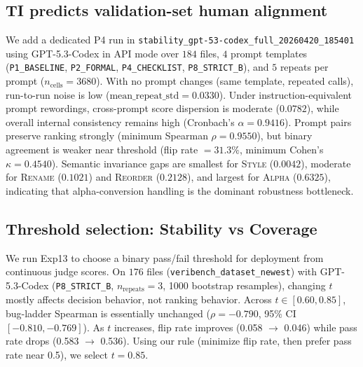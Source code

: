 \documentclass{article}
\begin{document}
\subsection{TI predicts validation-set human alignment}
We add a dedicated P4 run in \texttt{stability\_gpt-53-codex\_full\_20260420\_185401} using GPT-5.3-Codex in API mode over \(184\) files, \(4\) prompt templates (\texttt{P1\_BASELINE}, \texttt{P2\_FORMAL}, \texttt{P4\_CHECKLIST}, \texttt{P8\_STRICT\_B}), and \(5\) repeats per prompt (\(n_\text{cells}=3680\)).
With no prompt changes (same template, repeated calls), run-to-run noise is low (\(\text{mean\_repeat\_std}=0.0330\)).
Under instruction-equivalent prompt rewordings, cross-prompt score dispersion is moderate (\(0.0782\)), while overall internal consistency remains high (Cronbach's \(\alpha=0.9416\)).
Prompt pairs preserve ranking strongly (minimum Spearman \(\rho=0.9550\)), but binary agreement is weaker near threshold (flip rate \(=31.3\%\), minimum Cohen's \(\kappa=0.4540\)).
Semantic invariance gaps are smallest for \textsc{Style} (\(0.0042\)), moderate for \textsc{Rename} (\(0.1021\)) and \textsc{Reorder} (\(0.2128\)), and largest for \textsc{Alpha} (\(0.6325\)), indicating that alpha-conversion handling is the dominant robustness bottleneck.

\subsection{Threshold selection: Stability vs Coverage}
We run Exp13 to choose a binary pass/fail threshold for deployment from continuous judge scores.
On \(176\) files (\texttt{veribench\_dataset\_newest}) with GPT-5.3-Codex (\texttt{P8\_STRICT\_B}, \(n_\text{repeats}=3\), 1000 bootstrap resamples), changing \(t\) mostly affects decision behavior, not ranking behavior.
Across \(t\in[0.60,0.85]\), bug-ladder Spearman is essentially unchanged (\(\rho=-0.790\), 95\% CI \([-0.810,-0.769]\)).
As \(t\) increases, flip rate improves (0.058 \(\rightarrow\) 0.046) while pass rate drops (0.583 \(\rightarrow\) 0.536).
Using our rule (minimize flip rate, then prefer pass rate near 0.5), we select \(t=0.85\).
\end{document}
